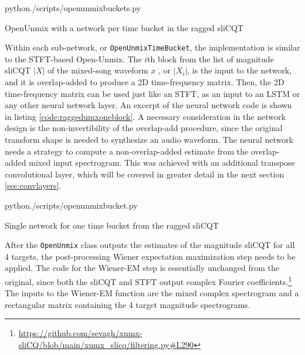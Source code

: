 \documentclass[report.tex]{subfiles}
\begin{document}
\begin{listing}[ht]
  \centering
\begin{inputminted}[linenos,breaklines,frame=single,fontsize=\scriptsize]{python}{./scripts/openunmixbuckets.py}
\end{inputminted}
  \caption{OpenUnmix with a network per time bucket in the ragged sliCQT}
  \label{code:raggedumx}
\end{listing}

Within each sub-network, or \Verb#OpenUnmixTimeBucket#, the implementation is similar to the STFT-based Open-Unmix. The $i$th block from the list of magnitude sliCQT $|X|$ of the mixed-song waveform $x$ , or $|X_{i}|$, is the input to the network, and it is overlap-added to produce a 2D time-frequency matrix. Then, the 2D time-frequency matrix can be used just like an STFT, as an input to an LSTM or any other neural network layer. An excerpt of the neural network code is shown in listing \ref{code:raggedumxoneblock}.  A necessary consideration in the network design is the non-invertibility of the overlap-add procedure, since the original transform shape is needed to synthesize an audio waveform. The neural network needs a strategy to compute a non-overlap-added estimate from the overlap-added mixed input spectrogram. This was achieved with an additional transpose convolutional layer, which will be covered in greater detail in the next section \ref{sec:convlayers}.

\begin{listing}[ht]
  \centering
\begin{inputminted}[linenos,breaklines,frame=single,fontsize=\scriptsize]{python}{./scripts/openunmixbucket.py}
\end{inputminted}
  \caption{Single network for one time bucket from the ragged sliCQT}
  \label{code:raggedumxoneblock}
\end{listing}

After the \Verb#OpenUnmix# class outputs the estimates of the magnitude sliCQT for all 4 targets, the post-processing Wiener expectation maximization step needs to be applied. The code for the Wiener-EM step is essentially unchanged from the original, since both the sliCQT and STFT output complex Fourier coefficients.\footnote{\url{https://github.com/sevagh/xumx-sliCQ/blob/main/xumx_slicq/filtering.py\#L290}} The inputs to the Wiener-EM function are the mixed complex spectrogram and a rectangular matrix containing the 4 target magnitude spectrograms.
\end{document}
